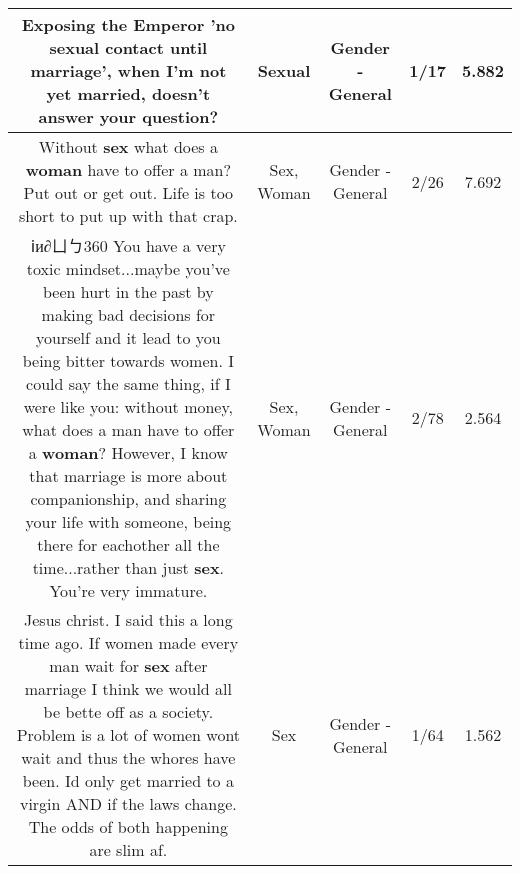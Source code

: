 \documentclass[11pt]{article}
\newlength\mylength
\begin{document}
\begin{center}
\begin{longtable}{|C{.65\mylength}|C{.30\mylength}|C{.12\mylength}|C{.12\mylength}|C{.12\mylength}|}
  \small Exposing the Emperor 'no \textbf{sexual} contact until marriage', when I'm not yet married, doesn't answer your question?\normalsize   & Sexual & Gender - General & 1/17 & 5.882 \\  \hline
  \small Without \textbf{sex} what does a \textbf{woman} have to offer a man? Put out or get out. Life is too short to put up with that crap.\normalsize   & Sex, Woman & Gender - General & 2/26 & 7.692 \\  \hline
  \small ⅰи∂ㄩㄅ360 You have a very toxic mindset...maybe you've been hurt in the past by making bad decisions for yourself and it lead to you being bitter towards women.  I could say the same thing, if I were like you: without money, what does a man have to offer a \textbf{woman}? However, I know that marriage is more about companionship, and sharing your life with someone, being there for eachother all the time...rather than just \textbf{sex}. You're very immature.\normalsize   & Sex, Woman & Gender - General & 2/78 & 2.564 \\  \hline
  \small Jesus christ. I said this a long time ago. If women made every man wait for \textbf{sex} after marriage I think we would all be bette off as a society. Problem is a lot of women wont wait and thus the whores have been. Id only get married to a virgin AND if the laws change. The odds of both happening are slim af.\normalsize   & Sex & Gender - General & 1/64 & 1.562 \\  \hline

\end{longtable}
\end{center}
\end{document}
